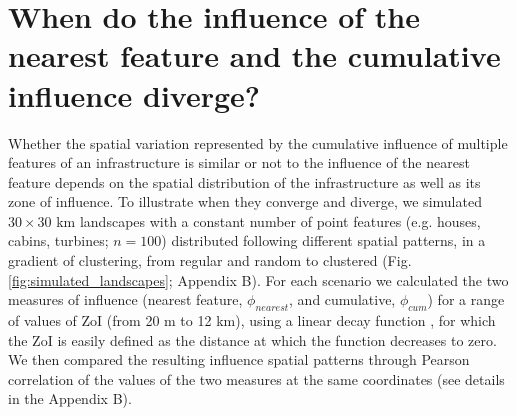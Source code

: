 \documentclass[titlepage]{article}
\begin{document}

\section{When do the influence of the nearest feature and the cumulative influence diverge?}

Whether the spatial variation represented by the cumulative influence of multiple features of an infrastructure is similar or not to the influence of the nearest feature depends on the spatial distribution of the infrastructure as well as its zone of influence. To illustrate when they converge and diverge, we simulated $30 \times 30$ km landscapes with a constant number of point features (e.g. houses, cabins, turbines; $n = 100$) distributed following different spatial patterns, in a gradient of clustering, from regular and random to clustered (Fig. \ref{fig:simulated_landscapes}; Appendix B). For each scenario we calculated the two measures of influence (nearest feature, $\phi_{nearest}$, and cumulative, $\phi_{cum}$) for a range of values of ZoI (from 20 m to 12 km), using a linear decay function \citep[Fig. \ref{fig:zoi_conceptual}; ``Bartlett" or tent-shaped decay;][]{harris_use_1978}, for which the ZoI is easily defined as the distance at which the function decreases to zero. We then compared the resulting influence spatial patterns through Pearson correlation of the values of the two measures at the same coordinates (see details in the Appendix B). 
\end{document}
